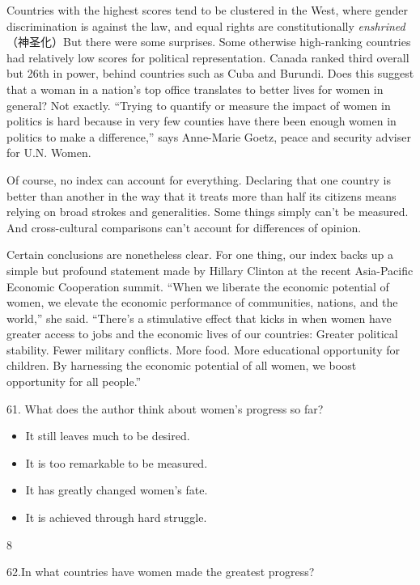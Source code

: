 \documentclass[UTF8,11pt]{ctexart}
\begin{document}
Countries with the highest scores tend to be clustered in the West, where gender discrimination is against the law, and equal rights are constitutionally\textit{ enshrined}（神圣化）But there were some surprises. Some otherwise high-ranking countries had relatively low scores for political representation. Canada ranked third overall but 26th in power, behind countries such as Cuba and Burundi. Does this suggest that a woman in a nation’s top office translates to better lives for women in general? Not exactly. “Trying to quantify or measure the impact of women in politics is hard because in very few counties have there been enough women in politics to make a difference,” says Anne-Marie Goetz, peace and security adviser for U.N. Women.


Of course, no index can account for everything. Declaring that one country is better than another in the way that it treats more than half its citizens means relying on broad strokes and generalities. Some things simply can’t be measured. And cross-cultural comparisons can’t account for differences of opinion.


Certain conclusions are nonetheless clear. For one thing, our index backs up a simple but profound statement made by Hillary Clinton at the recent Asia-Pacific Economic Cooperation summit. “When we liberate the economic potential of women, we elevate the economic performance of communities, nations, and the world,” she said. “There’s a stimulative effect that kicks in when women have greater access to jobs and the economic lives of our countries: Greater political stability. Fewer military conflicts. More food. More educational opportunity for children. By harnessing the economic potential of all women, we boost opportunity for all people.”


61. What does the author think about women’s progress so far?


\begin{itemize}[leftmargin=2em,itemsep=.2em,topsep=.4em]\item[A.] It still leaves much to be desired.
\item[B.] It is too remarkable to be measured.
\item[C.] It has greatly changed women’s fate.
\item[D.] It is achieved through hard struggle.
\end{itemize}

8


62.In what countries have women made the greatest progress?
\end{document}

